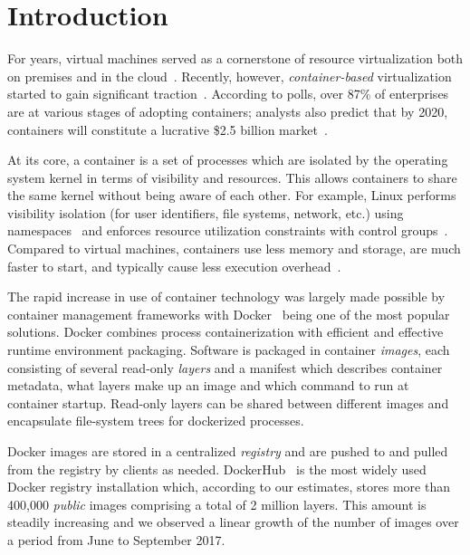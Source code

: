 \section{Introduction}

For years, virtual machines served as a cornerstone of resource virtualization
both on premises and in the cloud~\cite{rosenblum2005virtual}.
%
Recently, however, \emph{container-based} virtualization started to gain
significant traction~\cite{process-containers-linux}.
%
According to polls, over 87\% of enterprises are at various stages of adopting
containers; analysts also predict that by 2020, containers will constitute a
lucrative \$2.5 billion market~\cite{container-grow-by2020}.

At its core, a container is a set of processes which are isolated by the operating
system kernel in terms of visibility and resources. This allows containers to share
the same kernel without being aware of each other.
%
For example, Linux performs visibility isolation (for user identifiers, file systems,
network, etc.) using namespaces~\cite{man-namespaces} and enforces resource
utilization constraints with control groups~\cite{kernel-doc-cgroups}.
%
Compared to virtual machines, containers use less memory and storage, are much
faster to start, and typically cause less execution
overhead~\cite{felter2015updated, container-efficiency}.

The rapid increase in use of container technology was largely made possible by
container management frameworks with Docker~\cite{docker} being one of the most
popular solutions. Docker combines process containerization with efficient and
effective runtime environment packaging. Software is packaged in container
\emph{images}, each consisting of several read-only \emph{layers} and a manifest
which describes container metadata, \eg what layers make up an image and which command
to run at container startup. Read-only layers can be shared between different images
and encapsulate file-system trees for dockerized processes.

%

Docker images are stored in a centralized \emph{registry} and are pushed to
and pulled from the registry by clients as needed. DockerHub~\cite{dockerhub} is
the most widely used Docker registry installation which, according to our estimates,
stores more than 400,000 \emph{public} images comprising a total of 2 million layers.
This amount is steadily increasing and we observed a linear growth of the number of
images over a period from June to September 2017.

